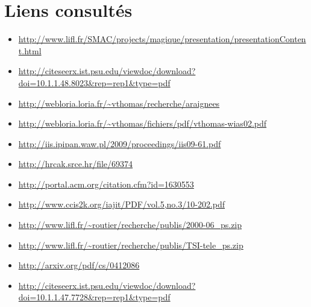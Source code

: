 \section{Liens consultés}

\begin{itemize}
  \item \url{http://www.lifl.fr/SMAC/projects/magique/presentation/presentationContent.html}
  \item \url{http://citeseerx.ist.psu.edu/viewdoc/download?doi=10.1.1.48.8023\&rep=rep1\&type=pdf}
  \item \url{http://webloria.loria.fr/~vthomas/recherche/araignees}
  \item \url{http://webloria.loria.fr/~vthomas/fichiers/pdf/vthomas-wias02.pdf}

  \item \url{http://iis.ipipan.waw.pl/2009/proceedings/iis09-61.pdf}
  \item \url{http://hrcak.srce.hr/file/69374}
  \item \url{http://portal.acm.org/citation.cfm?id=1630553}
  \item \url{http://www.ccis2k.org/iajit/PDF/vol.5,no.3/10-202.pdf}
  \item \url{http://www.lifl.fr/~routier/recherche/publis/2000-06\_ps.zip}
  \item \url{http://www.lifl.fr/~routier/recherche/publis/TSI-tele\_ps.zip}
  \item \url{http://arxiv.org/pdf/cs/0412086}
  \item \url{http://citeseerx.ist.psu.edu/viewdoc/download?doi=10.1.1.47.7728\&rep=rep1\&type=pdf}
\end{itemize}



